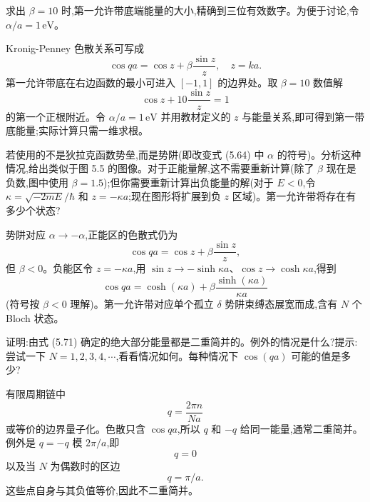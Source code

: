 \begin{question}
求出 $\beta=10$ 时,第一允许带底端能量的大小,精确到三位有效数字。为便于讨论,令 $\alpha/a=1\,\mathrm{eV}$。
\end{question}
\begin{solution}

Kronig-Penney 色散关系可写成
\[
\cos qa=\cos z+\beta\frac{\sin z}{z},
\quad z=ka.
\]
第一允许带底在右边函数的最小可进入 $[-1,1]$ 的边界处。取 $\beta=10$ 数值解
\[
\cos z+10\frac{\sin z}{z}=1
\]
的第一个正根附近。令 $\alpha/a=1\,\mathrm{eV}$ 并用教材定义的 $z$ 与能量关系,即可得到第一带底能量;实际计算只需一维求根。

\end{solution}

\begin{question}
若使用的不是狄拉克函数势垒,而是势阱(即改变式 (5.64) 中 $\alpha$ 的符号)。分析这种情况,给出类似于图 5.5 的图像。对于正能量解,这不需要重新计算(除了 $\beta$ 现在是负数,图中使用 $\beta=1.5$);但你需要重新计算出负能量的解(对于 $E<0$,令 $\kappa=\sqrt{-2mE}/\hbar$ 和 $z=-\kappa a$;现在图形将扩展到负 $z$ 区域)。第一允许带将存在有多少个状态?

\par\smallskip
{}

\end{question}
\begin{solution}

势阱对应 $\alpha\to-\alpha$,正能区的色散式仍为
\[
\cos qa=\cos z+\beta\frac{\sin z}{z},
\]
但 $\beta<0$。负能区令 $z=-\kappa a$,用 $\sin z\to-\sinh\kappa a$、$\cos z\to\cosh\kappa a$,得到
\[
\cos qa=\cosh(\kappa a)+\beta\frac{\sinh(\kappa a)}{\kappa a}
\]
(符号按 $\beta<0$ 理解)。第一允许带对应单个孤立 $\delta$ 势阱束缚态展宽而成,含有 $N$ 个 Bloch 状态。

\end{solution}

\begin{question}
证明:由式 (5.71) 确定的绝大部分能量都是二重简并的。例外的情况是什么?提示:尝试一下 $N=1,2,3,4,\cdots$,看看情况如何。每种情况下 $\cos(qa)$ 可能的值是多少?

\par\smallskip
{}

\end{question}
\begin{solution}

有限周期链中
\[
q=\frac{2\pi n}{Na}
\]
或等价的边界量子化。色散只含 $\cos qa$,所以 $q$ 和 $-q$ 给同一能量,通常二重简并。例外是 $q=-q$ 模 $2\pi/a$,即
\[
q=0
\]
以及当 $N$ 为偶数时的区边
\[
q=\pi/a.
\]
这些点自身与其负值等价,因此不二重简并。

\end{solution}

